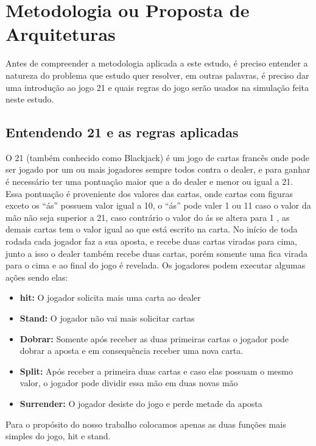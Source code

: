 \section{Metodologia ou Proposta de Arquiteturas}

    Antes de compreender a metodologia aplicada a este estudo, é preciso entender
    a natureza do problema que estudo quer resolver, em outras palavras, é preciso 
    dar uma introdução ao jogo 21 e quais regras do jogo serão usados na simulação 
    feita neste estudo.

\subsection{Entendendo 21 e as regras aplicadas}

    O 21 (também conhecido como Blackjack) é um jogo de cartas francês onde pode ser 
    jogado por um ou mais jogadores sempre todos contra o dealer, e para ganhar 
    é necessário ter uma pontuação maior que a do dealer e menor ou igual a 21.
    Essa pontuação é proveniente dos valores das cartas, onde cartas com figuras exceto os “ás” 
    possuem valor igual a 10, o “ás” pode valer 1 ou 11 caso o valor da mão não
    seja superior a 21, caso contrário o valor do ás se altera para 1 , as demais 
    cartas tem o valor igual ao que está escrito na carta. 
    No início de toda rodada cada jogador faz a sua aposta, e recebe duas 
    cartas viradas para cima, junto a isso o dealer também recebe duas cartas,
    porém somente uma fica virada para o cima e ao final do jogo é revelada. 
    Os jogadores podem executar algumas ações sendo elas:
\begin{itemize}
    \item \textbf{hit:} O jogador solicita mais uma carta ao dealer  
    \item \textbf{Stand:} O jogador não vai mais solicitar cartas 
    \item \textbf{Dobrar:} Somente após receber as duas primeiras cartas o 
    jogador pode dobrar a aposta e em consequência receber uma nova carta.
    \item \textbf{Split:} Após receber a primeira duas cartas e caso elas 
    possuam o mesmo valor, o jogador pode dividir essa mão em duas novas mão
    \item \textbf{Surrender:}  O jogador desiste do jogo e perde metade da aposta  
\end{itemize}

    Para o propósito do nosso trabalho colocamos apenas as duas funções 
    mais simples do jogo, hit e stand. 

